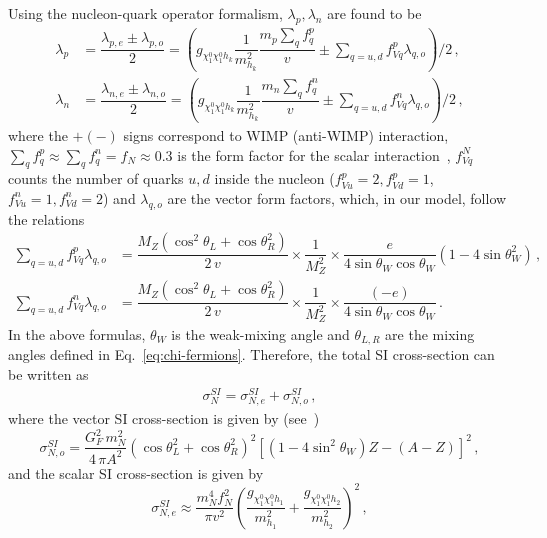 \documentclass[12pt,letterpaper]{article}
\begin{document}
Using the nucleon-quark operator formalism, $\lambda_p , \lambda_n$ are found to be~\cite{Belanger:2008sj}
\begin{align}
\label{eq:lp-ln}
\lambda_p &= \dfrac{\lambda_{p,e}\pm\lambda_{p,o}}{2}
=\left( g_{\chi_1^0\chi_1^0 h_k}\dfrac{1}{m_{h_k}^2}\dfrac{m_p\sum_{q}f_q^p}{v} 
\pm\sum_{q=u,d}f^p_{Vq}\lambda_{q,o}\right)/2 \,, \\
\lambda_n &= \dfrac{\lambda_{n,e}\pm\lambda_{n,o}}{2}
=\left( g_{\chi_1^0\chi_1^0 h_k}\dfrac{1}{m_{h_k}^2}\dfrac{m_n\sum_{q}f_q^n}{v} 
\pm\sum_{q=u,d}f^n_{Vq}\lambda_{q,o}\right)/2\,,
\end{align}
where the $+(-)$ signs correspond to WIMP (anti-WIMP) interaction, $\sum_{q}f_q^p \approx \sum_{q}f_q^n = f_N \approx 0.3$ is the form factor for the scalar interaction~\cite{Alarcon:2011zs,Alarcon:2012nr}, $f_{Vq}^N$ counts the number of quarks $u,d$ inside the nucleon ($f_{Vu}^p=2, f_{Vd}^p=1$, $f_{Vu}^n=1, f_{Vd}^n=2$) and $\lambda_{q,o}$ are the vector form factors, which, in our model, follow the relations
\begin{align}
\label{eq:fV-factors}
\sum_{q=u,d}f^p_{Vq}\lambda_{q,o}&=\dfrac{M_Z (\cos^2\theta_L+\cos\theta_R^2)}{2\,v}\times \dfrac{1}{M_Z^2}\times \dfrac{e}{4\sin\theta_W\cos\theta_W}(1-4\sin\theta_W^2) \,,\\
\sum_{q=u,d}f^n_{Vq}\lambda_{q,o}&=\dfrac{M_Z (\cos^2\theta_L+\cos\theta_R^2)}{2\,v}\times \dfrac{1}{M_Z^2}\times \dfrac{(-e)}{4\sin\theta_W\cos\theta_W}\,.
\end{align}
In the above formulas, $\theta_W$ is the weak-mixing angle and $\theta_{L,R}$ are the mixing angles defined in Eq.~\eqref{eq:chi-fermions}.  
Therefore, the total SI cross-section can be written as
\begin{align}
\label{eq:full-SI}
\sigma_N^{SI} = \sigma^{SI}_{N,e} +  \sigma^{SI}_{N,o} \,,
\end{align}
where the vector SI cross-section is given by (see~\cite{Lewin:1995rx, Yaguna:2015mva})
\begin{equation}
\label{eq:SI-vector}
\sigma^{SI}_{N,o} = \dfrac{G_F^2\, m_N^2}{4\,\pi A^2}(\cos\theta_L^2+\cos\theta_R^2)^2
\left[(1-4\sin^2\theta_W)Z-(A-Z)\right]^2 \,,
\end{equation}
and the scalar SI cross-section is given by
\begin{equation}
\label{eq:SI-scalar}
\sigma^{SI}_{N,e} \approx \dfrac{ m_N^4 f_N^2}{\pi v^2}
\left(\dfrac{g_{\chi_1^0\chi_1^0 h_1}}{m_{h_1}^2} + \dfrac{g_{\chi_1^0\chi_1^0 h_2}}{m_{h_2}^2}\right)^2\,,
\end{equation}
\end{document}
